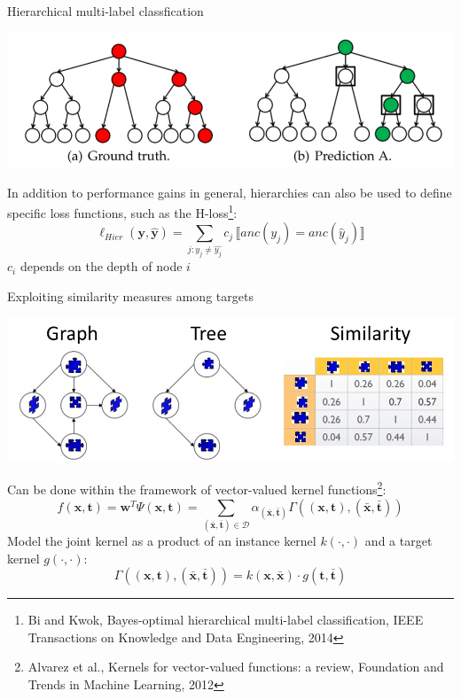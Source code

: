 \documentclass[]{beamer}
\renewcommand{\vec}[1]{\boldsymbol{#1}}
\newcommand{\assert}[1]{\llbracket #1 \rrbracket}
\begin{document}
\begin{frame}{Hierarchical multi-label classfication}

\vspace{-0.2cm}
\begin{center}
\includegraphics[width=\textwidth]{Figures/hloss}
\end{center}

\vspace{-0.2cm}
In addition to performance gains in general, hierarchies can also be used to define specific loss functions, such as the H-loss\footnote{Bi and Kwok, Bayes-optimal hierarchical multi-label classification, IEEE Transactions on Knowledge and Data Engineering, 2014}: 
$$\ell_{Hier}(\vec{y},\hat{\vec{y}}) = \sum_{j: y_j \neq \hat{y_j}} c_j \, \assert{\textit{anc}(y_j) = \textit{anc}(\hat{y}_j)}$$
$c_i$ depends on the depth of node $i$
\end{frame}

\begin{frame}{Exploiting similarity measures among targets}

\begin{center}
\includegraphics[scale=0.3,trim = 600 0 0 90,clip]{pics/targetrelations}
\end{center} 
Can be done within the framework of vector-valued kernel functions\footnote{Alvarez et al., Kernels for vector-valued functions: a review, Foundation and Trends in Machine Learning, 2012}:
\begin{equation*}
\label{eq:pairwise}
f(\vec{x},\vec{t}) = \vec{w}^T \Psi(\vec{x},\vec{t}) = \sum_{(\bar{\vec{x}},\bar{\vec{t}}) \in \mathcal{D}} \alpha_{(\bar{\vec{x}},\bar{\vec{t}})} \Gamma((\vec{x},\vec{t}),(\bar{\vec{x}},\bar{\vec{t}})) 
\end{equation*}
Model the joint kernel as a product of an instance kernel $k(\cdot,\cdot)$ and a target kernel $g(\cdot,\cdot)$: 
$$\Gamma((\vec{x},\vec{t}),(\bar{\vec{x}},\bar{\vec{t}})) = k(\vec{x},\bar{\vec{x}}) \cdot g(\vec{t},\bar{\vec{t}})$$

\end{frame}
\end{document}
